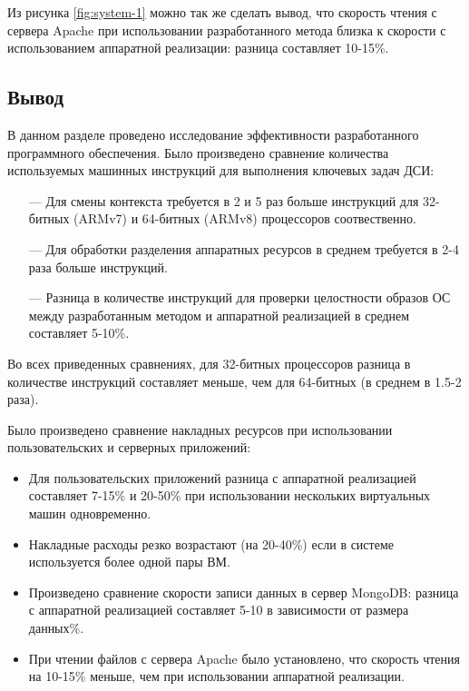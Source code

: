 Из рисунка \ref{fig:system-1} можно так же сделать вывод, что скорость чтения с сервера Apache при использовании разработанного метода близка к скорости с использованием аппаратной реализации: разница составляет 10-15\%.

\subsection*{Вывод}

В данном разделе проведено исследование эффективности разработанного программного обеспечения. Было произведено сравнение количества используемых машинных инструкций для выполнения ключевых задач ДСИ: 

\begin{itemize}
	\item [---] Для смены контекста требуется в 2 и 5 раз больше инструкций для 32-битных (ARMv7) и 64-битных (ARMv8) процессоров соотвественно.
	\item [---] Для обработки разделения аппаратных ресурсов в среднем требуется в 2-4 раза больше инструкций.
	\item [---] Разница в количестве инструкций для проверки целостности образов ОС между разработанным методом и аппаратной реализацией в среднем составляет 5-10\%.
\end{itemize}

Во всех приведенных сравнениях, для 32-битных процессоров разница в количестве инструкций составляет меньше, чем для 64-битных (в среднем в 1.5-2 раза). 

Было произведено сравнение накладных ресурсов при использовании пользовательских и серверных приложений:

\begin{itemize}
	\item Для пользовательских приложений разница с аппаратной реализацией составляет 7-15\% и 20-50\% при использовании нескольких виртуальных машин одновременно.
	\item Накладные расходы резко возрастают (на 20-40\%) если в системе используется более одной пары ВМ.
	\item Произведено сравнение скорости записи данных в сервер MongoDB: разница с аппаратной реализацией составляет 5-10 в зависимости от размера данных\%.
	\item При чтении файлов с сервера Apache было установлено, что скорость чтения на 10-15\% меньше, чем при использовании аппаратной реализации.
\end{itemize}

\pagebreak
